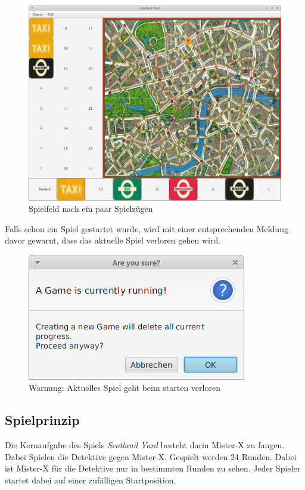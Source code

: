             \begin{figure}[H]
                \centering
                \includegraphics[scale=0.3]{img/benutzerhandbuch/gamerun.png}   
                \caption{Spielfeld nach ein paar Spielzügen}
                \label{abb_settings}
            \end{figure}

            Falls schon ein Spiel gestartet wurde, wird mit einer entsprechenden Meldung davor gewarnt,
            dass das aktuelle Spiel verloren gehen wird.

            \begin{figure}[H]
                \centering
                \includegraphics[scale=0.7]{img/benutzerhandbuch/dialognewgame.png}   
                \caption{Warnung: Aktuelles Spiel geht beim starten verloren}
                \label{abb_dialognewgame}
            \end{figure}
            
            
        \subsection{Spielprinzip}
            Die Kernaufgabe des Spiels \textit{Scotland Yard} besteht darin Mister-X zu fangen.
            Dabei Spielen die Detektive gegen Mister-X. Gespielt werden 24 Runden.
            Dabei ist Mister-X für die Detektive nur in bestimmten Runden zu sehen.
            Jeder Spieler startet dabei auf einer zufälligen Startposition.

